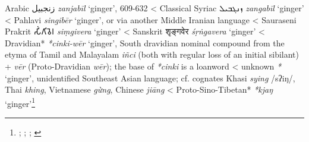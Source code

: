 \begin{etymology}\label{ety:zanjabil}
Arabic {زنجبيل} \textit{zanjabīl} `ginger', 609-632
< Classical Syriac {ܙܢܓܒܝܠ} \textit{zangabīl} `ginger'
< Pahlavi \textit{singibēr} `ginger', or via another Middle Iranian language
< Sauraseni Prakrit {𑀲𑀺𑀁𑀕𑀺𑀯𑁂𑀭} \textit{siṃgivera} `ginger'
< Sanskrit {शृङ्गवेर} \textit{śṛṅgavera} `ginger'
< Dravidian* \textit{*cinki-wēr} `ginger', South dravidian nominal compound  from the etyma of Tamil and Malayalam \textit{iñci} (both with regular loss of an initial sibilant) + \textit{vēr} (Proto-Dravidian \textit{wēr}); the base of \textit{*cinki} is a loanword
< unknown \textit{*} `ginger', unidentified Southeast Asian language; cf. cognates Khasi \textit{sying} /sʔiŋ/, Thai \textit{khing}, Vietnamese \textit{gừng}, Chinese \textit{jiāng}
< Proto-Sino-Tibetan* \textit{*kjaŋ} `ginger'\footnote{\textcite{cal}; \textcite[90]{ciancaglini_iranian_2008}; \textcite[5]{krishnamurti_dravidian_2003}; \textcite{oed}}
\end{etymology}